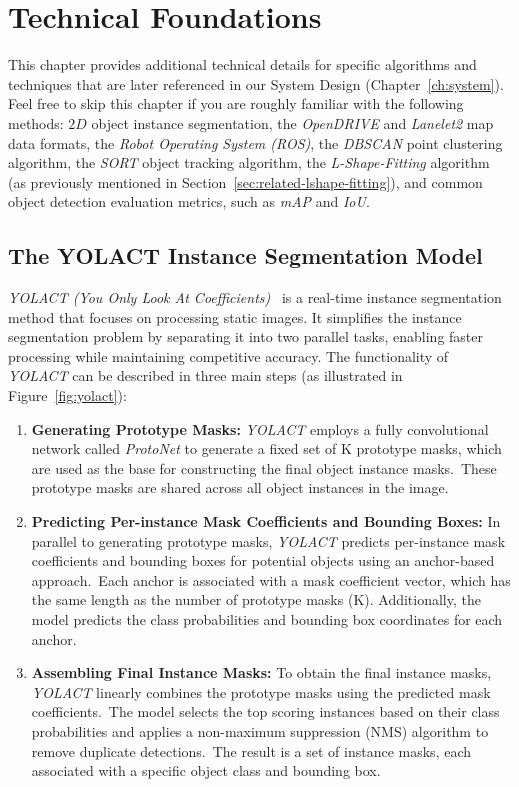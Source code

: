
\chapter{Technical Foundations}
\label{ch:tech}

This chapter provides additional technical details for specific algorithms and techniques that are later referenced in our System Design (Chapter~\ref{ch:system}). Feel free to skip this chapter if you are roughly familiar with the following methods: $2D$ object instance segmentation, the \textit{OpenDRIVE} and \textit{Lanelet2} map data formats, the \textit{Robot Operating System (ROS)}, the \textit{DBSCAN} point clustering algorithm, the \textit{SORT} object tracking algorithm, the \textit{L-Shape-Fitting} algorithm (as previously mentioned in Section~\ref{sec:related-lshape-fitting}), and common object detection evaluation metrics, such as \textit{mAP} and \textit{IoU}.

\section{The YOLACT Instance Segmentation Model}
\label{sec:yolact}

\textit{YOLACT (You Only Look At Coefficients)}~\cite{bolya2019yolact} is a real-time instance segmentation method that focuses on processing static images.
It simplifies the instance segmentation problem by separating it into two parallel tasks, enabling faster processing while maintaining competitive accuracy.
The functionality of \textit{YOLACT} can be described in three main steps (as illustrated in Figure~\ref{fig:yolact}):

\begin{enumerate}
    \item \textbf{Generating Prototype Masks:} \textit{YOLACT} employs a fully convolutional network called \textit{ProtoNet} to generate a fixed set of K prototype masks, which are used as the base for constructing the final object instance masks.\ These prototype masks are shared across all object instances in the image.
    \item \textbf{Predicting Per-instance Mask Coefficients and Bounding Boxes:} In parallel to generating prototype masks, \textit{YOLACT} predicts per-instance mask coefficients and bounding boxes for potential objects using an anchor-based approach.\ Each anchor is associated with a mask coefficient vector, which has the same length as the number of prototype masks (K). Additionally, the model predicts the class probabilities and bounding box coordinates for each anchor.
    \item \textbf{Assembling Final Instance Masks:} To obtain the final instance masks, \textit{YOLACT} linearly combines the prototype masks using the predicted mask coefficients.\ The model selects the top scoring instances based on their class probabilities and applies a non-maximum suppression (NMS) algorithm to remove duplicate detections.\ The result is a set of instance masks, each associated with a specific object class and bounding box.
\end{enumerate}

